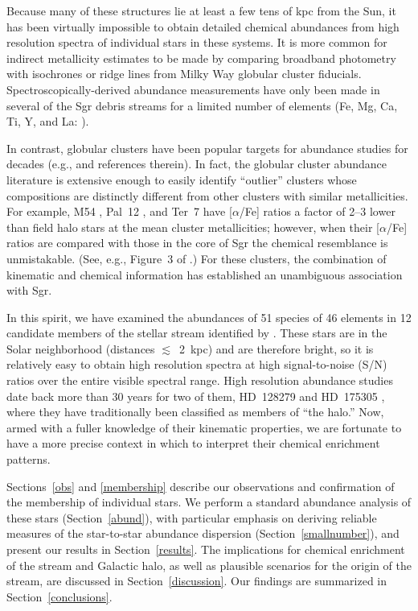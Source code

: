 \documentclass{emulateapj}
\begin{document}
Because many of these structures lie at least a few tens of kpc from
the Sun, it has been virtually impossible to 
obtain detailed chemical abundances from high resolution 
spectra of individual stars in these systems.
It is more common for indirect metallicity estimates to be made 
by comparing broadband photometry with isochrones or ridge lines 
from Milky Way globular cluster fiducials.
Spectroscopically-derived abundance measurements have only been made
in several of the Sgr debris streams for a limited number
of elements (Fe, Mg, Ca, Ti, Y, and La: \citealt{monaco07,chou07,chou10}).

In contrast, globular clusters
have been popular targets for abundance studies for decades
(e.g., \citealt{gratton04} and references therein).
In fact, the globular cluster abundance literature is extensive
enough to easily identify ``outlier'' clusters whose compositions 
are distinctly different from other clusters with similar metallicities.
For example, M54 \citep{brown99},
Pal~12 \citep{cohen04a}, and Ter~7 \citep{sbordone07}
have [$\alpha$/Fe] ratios a factor of 2--3 lower than field halo stars
at the mean cluster metallicities; however, 
when their [$\alpha$/Fe] ratios are compared with those in the core
of Sgr the chemical resemblance is unmistakable.
(See, e.g., Figure~3 of \citealt{sbordone07}.)
For these clusters, the combination of kinematic and chemical information
has established an unambiguous association with Sgr.

In this spirit, we have examined the abundances of 51 species of 
46 elements in 12 candidate members
of the stellar stream identified by \citet{helmi99b}.
These stars are in the Solar neighborhood (distances $\lesssim$~2~kpc)
and are therefore bright, so it is relatively easy
to obtain high resolution spectra at high signal-to-noise (S/N) ratios
over the entire visible spectral range.
High resolution abundance studies date back
more than 30 years for two of them,
\mbox{HD~128279} \citep{spite75} and
\mbox{HD~175305} \citep{wallerstein79},
where they have traditionally been classified as members of 
``the halo.''
Now, armed with a fuller knowledge of their kinematic properties,
we are fortunate to have a more precise context in which to interpret 
their chemical enrichment patterns.

Sections~\ref{obs} and \ref{membership} describe our observations
and confirmation of the membership of individual stars.
We perform a standard abundance analysis of these stars
(Section~\ref{abund}),
with particular emphasis on deriving reliable measures of
the star-to-star abundance dispersion
(Section~\ref{smallnumber}),
and present our results in Section~\ref{results}.
The implications for chemical enrichment of the stream and 
Galactic halo, as well as plausible scenarios for the origin
of the stream, are discussed in Section~\ref{discussion}.
Our findings are summarized in Section~\ref{conclusions}.
\end{document}
